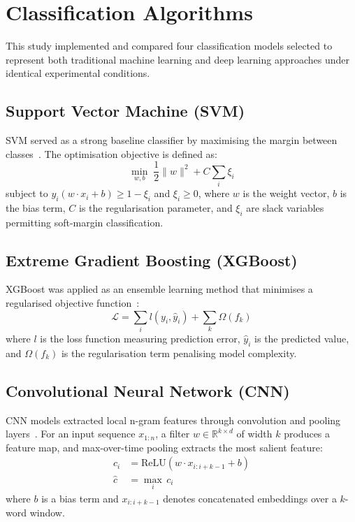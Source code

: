 \section{Classification Algorithms}
\label{sec:algorithms}

This study implemented and compared four classification models selected to represent both traditional machine learning and deep learning approaches under identical experimental conditions.

\subsection{Support Vector Machine (SVM)}

SVM served as a strong baseline classifier by maximising the margin between classes~\citep{dzikovska2012using}. The optimisation objective is defined as:
\begin{equation}
\min_{w, b} \;\frac{1}{2}\|w\|^2 + C \sum_{i} \xi_i
\label{eq:svm}
\end{equation}
subject to $y_i(w \cdot x_i + b) \geq 1 - \xi_i$ and $\xi_i \geq 0$, where $w$ is the weight vector, $b$ is the bias term, $C$ is the regularisation parameter, and $\xi_i$ are slack variables permitting soft-margin classification.

\subsection{Extreme Gradient Boosting (XGBoost)}

XGBoost was applied as an ensemble learning method that minimises a regularised objective function~\citep{chen2016xgboost}:
\begin{equation}
\mathcal{L} = \sum_{i} l(y_i, \hat{y}_i) + \sum_{k} \Omega(f_k)
\label{eq:xgboost}
\end{equation}
where $l$ is the loss function measuring prediction error, $\hat{y}_i$ is the predicted value, and $\Omega(f_k)$ is the regularisation term penalising model complexity.

\subsection{Convolutional Neural Network (CNN)}

CNN models extracted local n-gram features through convolution and pooling layers~\citep{hasan2019emotion}. For an input sequence $x_{1:n}$, a filter $w \in \mathbb{R}^{k \times d}$ of width $k$ produces a feature map, and max-over-time pooling extracts the most salient feature:
\begin{align}
c_i &= \text{ReLU}(w \cdot x_{i:i+k-1} + b) \label{eq:conv}\\
\hat{c} &= \max_{i}\, c_i \label{eq:maxpool}
\end{align}
where $b$ is a bias term and $x_{i:i+k-1}$ denotes concatenated embeddings over a $k$-word window.

